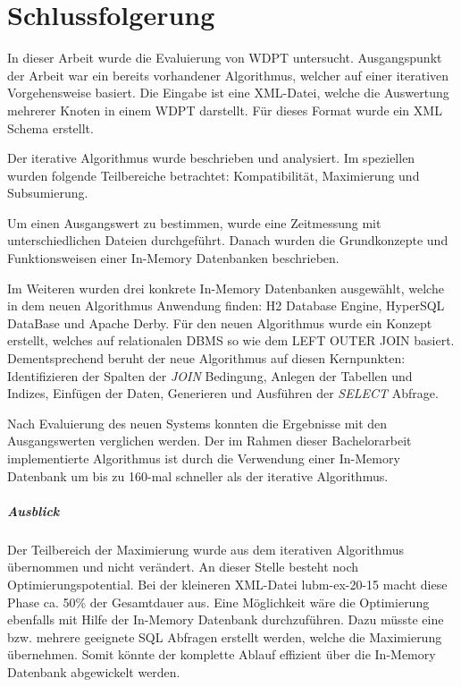 \documentclass[draft,final]{vutinfth} %
\begin{document}
\chapter{Schlussfolgerung}


In dieser Arbeit wurde die Evaluierung von WDPT untersucht. Ausgangspunkt der Arbeit war ein bereits vorhandener Algorithmus, welcher auf einer iterativen Vorgehensweise basiert.
Die Eingabe ist eine XML-Datei, welche die Auswertung mehrerer Knoten in einem WDPT darstellt. Für dieses Format wurde ein XML Schema erstellt.

Der iterative Algorithmus wurde beschrieben und analysiert. Im speziellen wurden folgende Teilbereiche betrachtet: Kompatibilität, Maximierung und Subsumierung.

Um einen Ausgangswert zu bestimmen, wurde eine Zeitmessung mit unterschiedlichen Dateien durchgeführt. 
Danach wurden die Grundkonzepte und Funktionsweisen einer In-Memory Datenbanken beschrieben. 

Im Weiteren wurden drei konkrete In-Memory Datenbanken ausgewählt, welche in dem neuen Algorithmus Anwendung finden: H2 Database Engine, HyperSQL DataBase und Apache Derby.
Für den neuen Algorithmus wurde ein Konzept erstellt, welches auf relationalen DBMS so wie dem LEFT OUTER JOIN basiert. 
Dementsprechend beruht der neue Algorithmus auf diesen Kernpunkten: Identifizieren der Spalten der \textit{JOIN} Bedingung, Anlegen der Tabellen und Indizes, Einfügen der Daten, Generieren und Ausführen der \textit{SELECT} Abfrage.

Nach Evaluierung des neuen Systems konnten die Ergebnisse mit den Ausgangswerten verglichen werden. Der im Rahmen dieser Bachelorarbeit implementierte Algorithmus ist durch die Verwendung einer In-Memory Datenbank um bis zu 160-mal schneller als der iterative Algorithmus.
   
\paragraph{Ausblick} Der Teilbereich der Maximierung wurde aus dem iterativen Algorithmus übernommen und nicht verändert. An dieser Stelle besteht noch Optimierungspotential. Bei der kleineren XML-Datei lubm-ex-20-15 macht diese Phase ca. 50\% der Gesamtdauer aus. Eine Möglichkeit wäre die Optimierung ebenfalls mit Hilfe der In-Memory Datenbank durchzuführen. Dazu müsste eine bzw. mehrere geeignete SQL Abfragen erstellt werden, welche die Maximierung übernehmen. Somit könnte der komplette Ablauf effizient über die In-Memory Datenbank abgewickelt werden.
\end{document}
